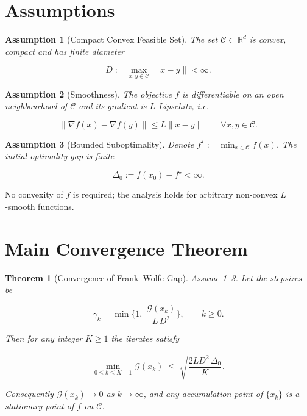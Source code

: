 \documentclass{article}
\newtheorem{theorem}{Theorem}
\newtheorem{assumption}{Assumption}
\newcommand{\gap}{\mathcal{G}}
\newcommand{\diam}{D}
\begin{document}
\section*{Assumptions}
\begin{assumption}[Compact Convex Feasible Set]\label{as:C}
The set $\mathcal C\subset\mathbb R^{d}$ is convex, compact and has finite diameter  

\[
\diam:=\max_{x,y\in\mathcal C}\|x-y\|<\infty .
\]
\end{assumption}

\begin{assumption}[Smoothness]\label{as:L}
The objective $f$ is differentiable on an open neighbourhood of $\mathcal C$ and its gradient is $L$‑Lipschitz, i.e.  

\[
\|\nabla f(x)-\nabla f(y)\|\le L\|x-y\|\qquad\forall x,y\in\mathcal C .
\tag{4}
\]
\end{assumption}

\begin{assumption}[Bounded Suboptimality]\label{as:Delta}
Denote $f^{\star}:=\min_{x\in\mathcal C}f(x)$.  The initial optimality gap is finite  

\[
\Delta_{0}:=f(x_{0})-f^{\star}<\infty .
\tag{5}
\]
\end{assumption}

No convexity of $f$ is required; the analysis holds for arbitrary non‑convex $L$‑smooth functions.

\section*{Main Convergence Theorem}
\begin{theorem}[Convergence of Frank–Wolfe Gap]\label{thm:main}
Assume \ref{as:C}–\ref{as:Delta}.  Let the stepsizes be  

\[
\gamma_{k}= \min\Big\{1,\;\frac{\gap(x_{k})}{L\,\diam^{2}}\Big\},\qquad k\ge0.
\tag{6}
\]

Then for any integer $K\ge1$ the iterates satisfy  

\[
\min_{0\le k\le K-1}\gap(x_{k})\;\le\;
\sqrt{\frac{2L\diam^{2}\,\Delta_{0}}{K}} .
\tag{7}
\]

Consequently $\gap(x_{k})\to0$ as $k\to\infty$, and any accumulation point of $\{x_{k}\}$ is a stationary point of $f$ on $\mathcal C$.
\end{theorem}
\end{document}
